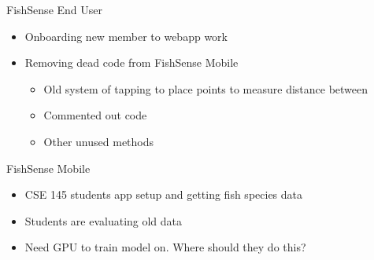 
\begin{frame}{FishSense End User}
    \begin{itemize}
        \item Onboarding new member to webapp work
        \item Removing dead code from FishSense Mobile 
        \begin{itemize}
            \item Old system of tapping to place points to measure distance between
            \item Commented out code
            \item Other unused methods
        \end{itemize}   
    \end{itemize}    
\end{frame}

\begin{frame}{FishSense Mobile}
\begin{itemize}
        \item CSE 145 students app setup and getting fish species data
        \item Students are evaluating old data
        \item Need GPU to train model on.  Where should they do this?
\end{itemize}
\end{frame}



